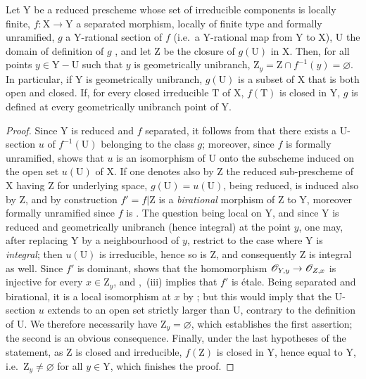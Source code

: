 \begin{proposition}[18.10.19]
\label{IV.18.10.19}
Let $\mathrm{Y}$ be a reduced prescheme whose set of irreducible components is locally finite, $f:\mathrm{X}\to\mathrm{Y}$ a separated morphism, locally of finite type and formally unramified, $g$ a $\mathrm{Y}$-rational section of $f$ (i.e.\ a $\mathrm{Y}$-rational map from $\mathrm{Y}$ to $\mathrm{X}$), $\mathrm{U}$ the domain of definition of $g$ , and let $\mathrm{Z}$ be the closure of $g(\mathrm{U})$ in $\mathrm{X}$.
Then, for all points $y\in\mathrm{Y}-\mathrm{U}$ such that $y$ is geometrically unibranch, $\mathrm{Z}_y=\mathrm{Z}\cap f^{-1}(y)=\varnothing$.
In particular, if $\mathrm{Y}$ is geometrically unibranch, $g(\mathrm{U})$ is a subset of $\mathrm{X}$ that is both open and closed.
If, for every closed irreducible $\mathrm{T}$ of $\mathrm{X}$, $f(\mathrm{T})$ is closed in $\mathrm{Y}$, $g$ is defined at every geometrically unibranch point of $\mathrm{Y}$.
\end{proposition}

\begin{proof}
Since $\mathrm{Y}$ is reduced and $f$ separated, it follows from  that there exists a $\mathrm{U}$-section $u$ of $f^{-1}(\mathrm{U})$ belonging to the class $g$; moreover, since $f$ is formally unramified,  shows that $u$ is an isomorphism of $\mathrm{U}$ onto the subscheme induced on the open set $u(\mathrm{U})$ of $\mathrm{X}$.
If one denotes also by $\mathrm{Z}$ the reduced sub-prescheme of $\mathrm{X}$ having $\mathrm{Z}$ for underlying space, $g(\mathrm{U})=u(\mathrm{U})$, being reduced, is induced also by $\mathrm{Z}$, and by construction $f'=f|\mathrm{Z}$ is a \emph{birational} morphism of $\mathrm{Z}$ to $\mathrm{Y}$, moreover formally unramified since $f$ is .
The question being local on $\mathrm{Y}$, and since $\mathrm{Y}$ is reduced and geometrically unibranch (hence integral) at the point $y$, one may, after replacing $\mathrm{Y}$ by a neighbourhood of $y$, restrict to the case where $\mathrm{Y}$ is \emph{integral}; then $u(\mathrm{U})$ is irreducible, hence so is $\mathrm{Z}$, and consequently $\mathrm{Z}$ is integral as well.
Since $f'$ is dominant,  shows that the homomorphism $\mathscr{O}_{Y,y}\to\mathscr{O}_{Z,x}$ is injective for every $x\in\mathrm{Z}_y$, and ,~(iii) implies that $f'$ is \'etale. Being separated and birational, it is a local isomorphism at $x$ by ; but this would imply that the $\mathrm{U}$-section $u$ extends to an open set strictly larger than $\mathrm{U}$, contrary to the definition of $\mathrm{U}$.
We therefore necessarily have $\mathrm{Z}_y=\varnothing$, which establishes the first assertion; the second is an obvious consequence.
Finally, under the last hypotheses of the statement, as $\mathrm{Z}$ is closed and irreducible, $f(\mathrm{Z})$ is closed in $\mathrm{Y}$, hence equal to $\mathrm{Y}$, i.e.\ $\mathrm{Z}_y\neq\varnothing$ for all $y\in\mathrm{Y}$, which finishes the proof.
\end{proof}

